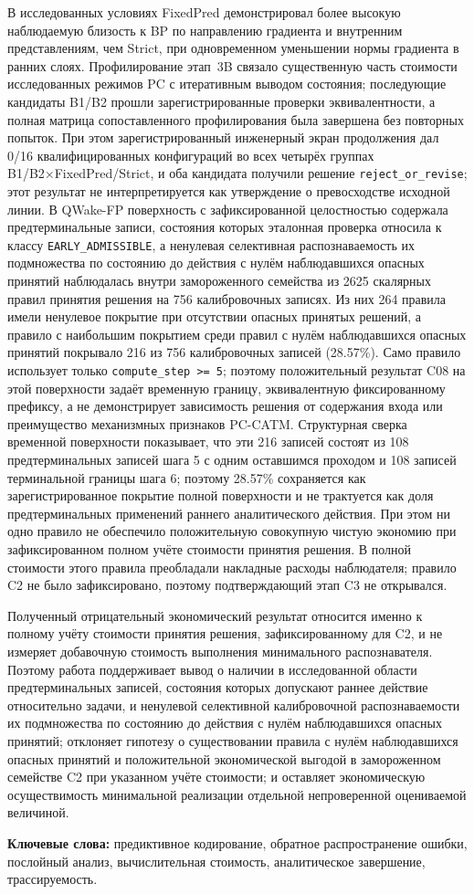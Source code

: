 В исследованных условиях FixedPred демонстрировал более высокую наблюдаемую
близость к BP по направлению градиента и внутренним представлениям, чем Strict,
при одновременном уменьшении нормы
градиента в ранних слоях. Профилирование этап~3B связало существенную часть
стоимости исследованных режимов PC с итеративным выводом состояния; последующие
кандидаты B1/B2 прошли зарегистрированные проверки эквивалентности, а полная
матрица сопоставленного профилирования была завершена без повторных попыток.
При этом зарегистрированный инженерный экран продолжения дал 0/16
квалифицированных конфигураций во всех четырёх группах B1/B2×FixedPred/Strict,
и оба кандидата получили решение \texttt{reject\_or\_revise}; этот результат не
интерпретируется как утверждение о превосходстве исходной линии. В QWake-FP поверхность с зафиксированной целостностью содержала предтерминальные
записи, состояния которых эталонная проверка относила к классу
\texttt{EARLY\_ADMISSIBLE}, а ненулевая селективная распознаваемость их
подмножества по состоянию до действия с нулём наблюдавшихся опасных принятий
наблюдалась внутри замороженного семейства из 2625 скалярных правил принятия
решения на 756 калибровочных записях. Из них 264 правила имели ненулевое
покрытие при отсутствии опасных принятых решений, а правило с наибольшим
покрытием среди правил с нулём наблюдавшихся опасных принятий покрывало 216
из 756 калибровочных записей (28.57\%). Само правило использует только
\texttt{compute\_step >= 5}; поэтому положительный результат C08 на этой
поверхности задаёт временную границу, эквивалентную фиксированному префиксу, а
не демонстрирует зависимость решения от содержания входа или преимущество
механизмных признаков PC-CATM. Структурная сверка временной поверхности
показывает, что эти 216 записей состоят из 108 предтерминальных записей шага 5 с
одним оставшимся проходом и 108 записей терминальной границы шага 6; поэтому
28.57\% сохраняется как зарегистрированное покрытие полной поверхности и не
трактуется как доля предтерминальных применений раннего аналитического действия. При этом ни одно правило
не обеспечило положительную совокупную чистую экономию при зафиксированном
полном учёте стоимости принятия решения. В полной стоимости этого правила
преобладали накладные расходы наблюдателя; правило C2 не было зафиксировано,
поэтому подтверждающий этап C3 не открывался.

Полученный отрицательный экономический результат относится именно к полному
учёту стоимости принятия решения, зафиксированному для C2, и не измеряет
добавочную стоимость выполнения минимального распознавателя. Поэтому работа
поддерживает вывод о наличии в исследованной области предтерминальных записей,
состояния которых допускают раннее действие относительно задачи, и ненулевой
селективной калибровочной распознаваемости их подмножества по состоянию до
действия с нулём наблюдавшихся опасных принятий;
отклоняет гипотезу о существовании
правила с нулём наблюдавшихся опасных принятий и положительной экономической
выгодой в замороженном семействе C2 при
указанном учёте стоимости; и оставляет экономическую осуществимость минимальной
реализации отдельной непроверенной оцениваемой величиной.

\noindent\textbf{Ключевые слова:} предиктивное кодирование, обратное
распространение ошибки, послойный анализ, вычислительная стоимость,
аналитическое завершение, трассируемость.
